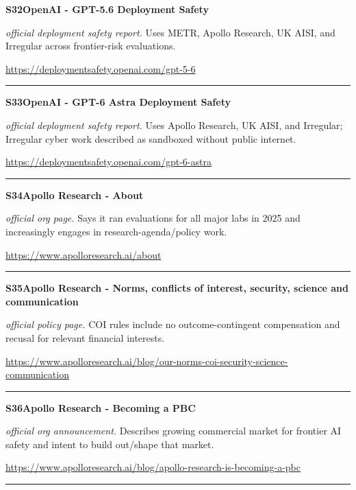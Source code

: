 \hypertarget{src:S32}{}\noindent\textbf{S32}\quad \textbf{OpenAI - GPT-5.6 Deployment Safety}\hfill{}\par
\smallskip
\noindent\textit{official deployment safety report.} Uses METR, Apollo Research, UK AISI, and Irregular across frontier-risk evaluations.\par
\noindent\url{https://deploymentsafety.openai.com/gpt-5-6}\par
\medskip\hrule\medskip

\hypertarget{src:S33}{}\noindent\textbf{S33}\quad \textbf{OpenAI - GPT-6 Astra Deployment Safety}\hfill{}\par
\smallskip
\noindent\textit{official deployment safety report.} Uses Apollo Research, UK AISI, and Irregular; Irregular cyber work described as sandboxed without public internet.\par
\noindent\url{https://deploymentsafety.openai.com/gpt-6-astra}\par
\medskip\hrule\medskip

\hypertarget{src:S34}{}\noindent\textbf{S34}\quad \textbf{Apollo Research - About}\hfill{}\par
\smallskip
\noindent\textit{official org page.} Says it ran evaluations for all major labs in 2025 and increasingly engages in research-agenda/policy work.\par
\noindent\url{https://www.apolloresearch.ai/about}\par
\medskip\hrule\medskip

\hypertarget{src:S35}{}\noindent\textbf{S35}\quad \textbf{Apollo Research - Norms, conflicts of interest, security, science and communication}\hfill{}\par
\smallskip
\noindent\textit{official policy page.} COI rules include no outcome-contingent compensation and recusal for relevant financial interests.\par
\noindent\url{https://www.apolloresearch.ai/blog/our-norms-coi-security-science-communication}\par
\medskip\hrule\medskip

\hypertarget{src:S36}{}\noindent\textbf{S36}\quad \textbf{Apollo Research - Becoming a PBC}\hfill{}\par
\smallskip
\noindent\textit{official org announcement.} Describes growing commercial market for frontier AI safety and intent to build out/shape that market.\par
\noindent\url{https://www.apolloresearch.ai/blog/apollo-research-is-becoming-a-pbc}\par
\medskip\hrule\medskip

